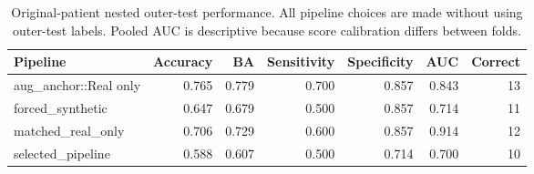 \begin{table}[t]
\centering
\caption{Original-patient nested outer-test performance. All pipeline choices are made without using outer-test labels. Pooled AUC is descriptive because score calibration differs between folds.}
\label{tab:outer_metrics}
\footnotesize
\setlength{\tabcolsep}{4pt}
\begin{tabular}{lrrrrrr}
\toprule
Pipeline & Accuracy & BA & Sensitivity & Specificity & AUC & Correct \\
\midrule
aug\_anchor::Real only & 0.765 & 0.779 & 0.700 & 0.857 & 0.843 & 13 \\
forced\_synthetic & 0.647 & 0.679 & 0.500 & 0.857 & 0.714 & 11 \\
matched\_real\_only & 0.706 & 0.729 & 0.600 & 0.857 & 0.914 & 12 \\
selected\_pipeline & 0.588 & 0.607 & 0.500 & 0.714 & 0.700 & 10 \\
\bottomrule
\end{tabular}
\end{table}
